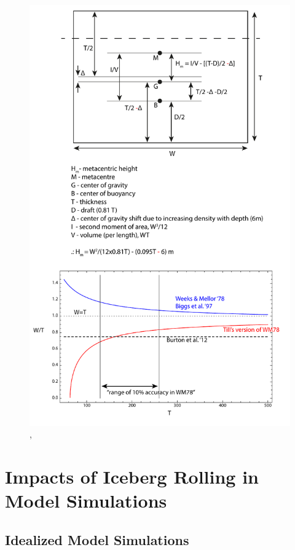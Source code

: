 \documentclass[twocol]{ametsoc_tw}
\begin{document}
 \begin{figure}[!t]
 \begin{center}
 \hspace{-.5 cm} \includegraphics[width=.8\linewidth]{Figs/Iceberg_Roll}
 \caption{, }
 \label{fig:bergschem}
 \end{center}
\end{figure}

\section{Impacts of Iceberg Rolling in Model Simulations}

\subsection{Idealized Model Simulations}
\end{document}
